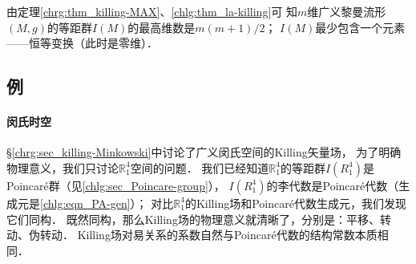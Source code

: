 \begin{remark}
	由定理\ref{chrg:thm_killing-MAX}、\ref{chlg:thm_la-killing}可
	知$m$维广义黎曼流形$(M,g)$的等距群$I(M)$的最高维数是$m(m+1)/2$；
	$I(M)$最少包含一个元素——恒等变换（此时是零维）．
\end{remark}








\subsection{例}\label{chlg:sec_killing-example}

\paragraph{闵氏时空}
\S\ref{chrg:sec_killing-Minkowski}中讨论了广义闵氏空间的Killing矢量场，
为了明确物理意义，我们只讨论$\mathbb{R}^4_1$空间的问题．
我们已经知道$\mathbb{R}^4_1$的等距群$I({R}^4_1)$是Poincar\'{e}群（见\ref{chlg:sec_Poincare-group}），
$I({R}^4_1)$的李代数是Poincar\'{e}代数（生成元是\eqref{chlg:eqn_PA-gen}）；
对比$\mathbb{R}^4_1$的Killing场和Poincar\'{e}代数生成元，我们发现它们同构．
既然同构，那么Killing场的物理意义就清晰了，分别是：平移、转动、伪转动．
Killing场对易关系的系数自然与Poincar\'{e}代数的结构常数本质相同．



